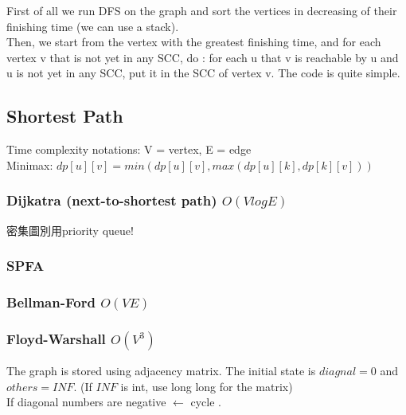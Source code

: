 \documentclass[10pt,oneside]{article}
\begin{document}
\begin{landscape}
\begin{multicols}{2}
{\normalsize 
First of all we run DFS on the graph and sort the vertices in decreasing of their finishing time (we can use a stack).\\
Then, we start from the vertex with the greatest finishing time, and for each vertex v that is not yet in any SCC, do : for each u that v is reachable by u and u is not yet in any SCC, put it in the SCC of vertex v. The code is quite simple.
}


\subsection{Shortest Path}

{\normalsize 
Time complexity notations: V = vertex, E = edge \\
Minimax: $dp[u][v] = min(dp[u][v], max(dp[u][k], dp[k][v]))$ \\
}


\subsubsection{Dijkatra (next-to-shortest path) $O(VlogE)$}
{\normalsize 密集圖別用priority queue! }

\subsubsection{SPFA}

\subsubsection{Bellman-Ford $O(VE)$}

\subsubsection{Floyd-Warshall $O(V^3)$}
{\normalsize 
The graph is stored using adjacency matrix. The initial state is $diagnal = 0$ and $others = INF$. (If $INF$ is int, use long long for the matrix)\\
If diagonal numbers are negative $\leftarrow$ cycle . \\
}


\end{multicols}
\end{landscape}
\end{document}

